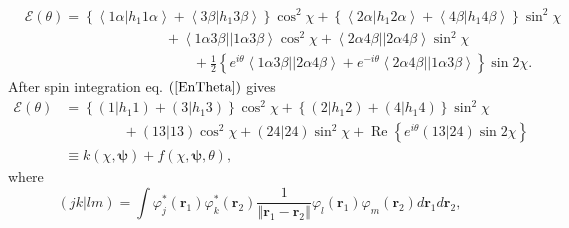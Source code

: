 \documentclass[aps,preprint]{revtex4}%
\begin{document}
\begin{align}
&  \mathcal{E}\left(  \theta\right)  =\left\{  \left\langle 1\alpha\left\vert
h_{1}1\alpha\right.  \right\rangle +\left\langle 3\beta\left\vert h_{1}%
3\beta\right.  \right\rangle \right\}  \cos^{2}\chi+\left\{  \left\langle
2\alpha\left\vert h_{1}2\alpha\right.  \right\rangle +\left\langle
4\beta\left\vert h_{1}4\beta\right.  \right\rangle \right\}  \sin^{2}%
\chi\nonumber\\
&  \qquad\qquad\qquad\qquad\qquad+\left\langle 1\alpha3\beta\right\vert
\left\vert 1\alpha3\beta\right\rangle \cos^{2}\chi+\left\langle 2\alpha
4\beta\right\vert \left\vert 2\alpha4\beta\right\rangle \sin^{2}%
\chi\nonumber\\
&  \qquad\qquad\qquad\qquad\qquad\qquad+\frac{1}{2}\left\{  e^{i\theta
}\left\langle 1\alpha3\beta\right\vert \left\vert 2\alpha4\beta\right\rangle
+e^{-i\theta}\left\langle 2\alpha4\beta\right\vert \left\vert 1\alpha
3\beta\right\rangle \right\}  \sin2\chi.\label{EnTheta}%
\end{align}
After spin integration eq. $\left(  \ref{EnTheta}\right)  $ gives
\begin{align}
\mathcal{E}\left(  \theta\right)   &  =\left\{  \left(  1\left\vert
h_{1}1\right.  \right)  +\left(  3\left\vert h_{1}3\right.  \right)  \right\}
\cos^{2}\chi+\left\{  \left(  2\left\vert h_{1}2\right.  \right)  +\left(
4\left\vert h_{1}4\right.  \right)  \right\}  \sin^{2}\chi\nonumber\\
&  \qquad\qquad\,+\left(  \left.  13\right\vert 13\right)  \cos^{2}%
\chi+\left(  \left.  24\right\vert 24\right)  \sin^{2}\chi+\operatorname{Re}%
\left\{  e^{i\theta}\left(  \left.  13\right\vert 24\right)  \sin
2\chi\right\}  \nonumber\\
&  \equiv k\left(  \chi,\boldsymbol{\psi}\right)  +f\left(  \chi
,\boldsymbol{\psi},\theta\right)  ,
\end{align}
where
\begin{equation}
\left(  \left.  jk\right\vert lm\right)  =\int\varphi_{j}^{\ast}\left(
\boldsymbol{r}_{1}\right)  \varphi_{k}^{\ast}\left(  \boldsymbol{r}%
_{2}\right)  \frac{1}{\left\Vert \boldsymbol{r}_{1}-\boldsymbol{r}%
_{2}\right\Vert }\varphi_{l}\left(  \boldsymbol{r}_{1}\right)  \varphi
_{m}\left(  \boldsymbol{r}_{2}\right)  d\boldsymbol{r}_{1}d\boldsymbol{r}_{2},
\end{equation}
%
\end{document}
